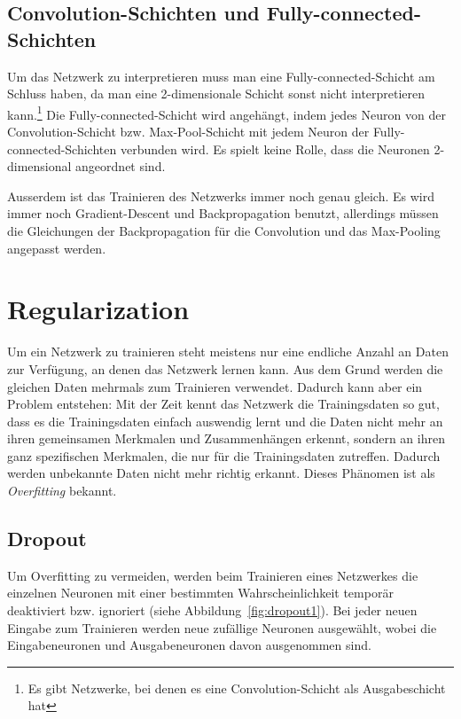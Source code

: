 \documentclass[12pt,a4paper]{report}
\begin{document}
\subsection{Convolution-Schichten und Fully-connected-Schichten}
Um das Netzwerk zu interpretieren muss man eine Fully-connected-Schicht am Schluss haben,
da man eine 2-dimensionale Schicht sonst nicht interpretieren kann.\footnote{Es gibt Netzwerke, bei denen es eine Convolution-Schicht als Ausgabeschicht hat\cite{fullconvolution}}
Die Fully-connected-Schicht wird angehängt, indem jedes Neuron von der Convolution-Schicht bzw. Max-Pool-Schicht mit jedem Neuron der Fully-connected-Schichten verbunden wird.
Es spielt keine Rolle, dass die Neuronen 2-dimensional angeordnet sind.

Ausserdem ist das Trainieren des Netzwerks immer noch genau gleich.
Es wird immer noch Gradient-Descent und Backpropagation benutzt,
allerdings müssen die Gleichungen der Backpropagation für die Convolution und das Max-Pooling angepasst werden.

\section{Regularization}
Um ein Netzwerk zu trainieren steht meistens nur eine endliche Anzahl an Daten zur Verfügung, an denen das Netzwerk lernen kann.
Aus dem Grund werden die gleichen Daten mehrmals zum Trainieren verwendet.
Dadurch kann aber ein Problem entstehen:
Mit der Zeit kennt das Netzwerk die Trainingsdaten so gut, dass es die Trainingsdaten einfach auswendig lernt
und die Daten nicht mehr an ihren gemeinsamen Merkmalen und Zusammenhängen erkennt,
sondern an ihren ganz spezifischen Merkmalen, die nur für die Trainingsdaten zutreffen.
Dadurch werden unbekannte Daten nicht mehr richtig erkannt.
Dieses Phänomen ist als \textit{Overfitting} bekannt.
\subsection{Dropout}
Um Overfitting zu vermeiden, werden beim Trainieren eines Netzwerkes die einzelnen Neuronen mit einer bestimmten Wahrscheinlichkeit temporär deaktiviert bzw. ignoriert (siehe Abbildung~\ref{fig:dropout1}).
Bei jeder neuen Eingabe zum Trainieren werden neue zufällige Neuronen ausgewählt,
wobei die Eingabeneuronen und Ausgabeneuronen davon ausgenommen sind.
\end{document}
